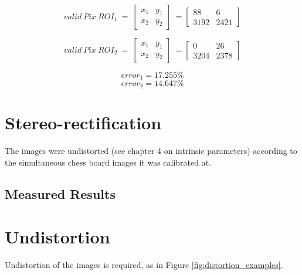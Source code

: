 \begin{equation}\label{eq::validpix1}
valid\ Pix\ ROI_1\ =\ 
\begin{bmatrix}
x_1 & y_1\\
x_2 & y_2
\end{bmatrix}\ =
\begin{bmatrix}
88 & 6\\
3192 & 2421
\end{bmatrix}
\end{equation}

\begin{equation}\label{eq::validpix2}
valid\ Pix\ ROI_2\ =\ 
\begin{bmatrix}
x_1 & y_1\\
x_2 & y_2
\end{bmatrix}\ =
\begin{bmatrix}
0 & 26\\
3204 & 2378
\end{bmatrix}
\end{equation}

\begin{equation}\label{eq::error1}
error_1 = 17.255\%
\end{equation}
\begin{equation}\label{eq::error2}
error_2 = 14.647\%
\end{equation}

\section{Stereo-rectification}

The images were undistorted (see chapter 4 on intrinsic parameters) according to the simultaneous chess board images it was calibrated at.

\subsection{Measured Results}

\section{Undistortion}
\label{sec:undistortion}

Undistortion of the images is required, as in Figure \ref{fig:distortion_examples}.


